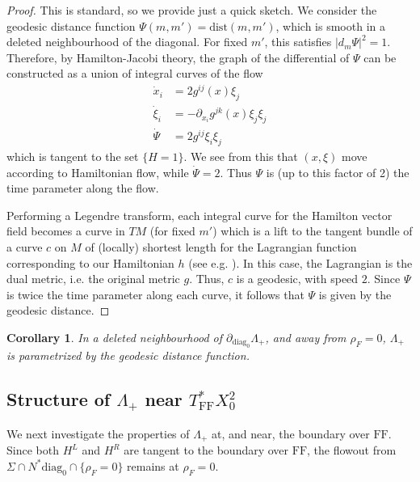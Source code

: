 \documentclass[10pt, a4paper, twoside]{amsart}
\numberwithin{equation}{section}
\newtheorem{corollary}[theorem]{Corollary}
\theoremstyle{remark}
\begin{document}
\begin{proof} This is standard, so we provide just a quick sketch. We consider the geodesic distance function $\Psi(m, m') = {\mathrm{dist}}(m, m')$, which is smooth in a deleted neighbourhood of the diagonal. For fixed $m'$, this satisfies $|d_m \Psi|^2 = 1$. Therefore, by Hamilton-Jacobi theory, the graph of the differential of $\Psi$ can be constructed as a union of integral curves of the flow 
\begin{equation}\begin{aligned}
\dot x_i &= 2 g^{ij}(x) \xi_j \\
\dot \xi_i &= - \partial_{x_i} g^{jk}(x) \xi_j \xi_j \\
\dot \Psi &= 2 g^{ij} \xi_i \xi_j
\end{aligned}\end{equation}
which is tangent to the set $\{ H = 1 \}$. We see from this that $(x, \xi)$ move according to Hamiltonian flow, while $\dot \Psi = 2$. Thus $\Psi$ is (up to this factor of 2) the time parameter along the flow. 

Performing a Legendre transform, each integral curve for the Hamilton vector field becomes a curve in $TM$ (for fixed $m'$) which is a lift to the tangent bundle of a curve $c$ on $M$ of (locally) shortest length for the Lagrangian function corresponding to our Hamiltonian $h$  (see e.g. \cite[Chapter 3]{Arnold}). In this case, the Lagrangian is the dual metric, i.e. the original metric $g$. Thus, $c$ is a geodesic, with speed $2$. Since $\Psi$ is twice the time parameter along each curve, it follows that $\Psi$ is given by the geodesic distance. 
\end{proof}

\begin{corollary} In a deleted neighbourhood of $\partial_{\mathrm{diag}_0} \Lambda_+$, and away from $\rho_F = 0$, $\Lambda_+$ is parametrized by the geodesic distance function. 
\end{corollary}

\subsection{Structure of $\Lambda_+$ near $T^*_{\mathrm{FF}} X^2_0$}

We next investigate the properties of $\Lambda_+$ at, and near, the boundary over ${\mathrm{FF}}$. Since both $H^L$ and $H^R$ are tangent to the boundary over ${\mathrm{FF}}$, the flowout from $\Sigma \cap N^* {\mathrm{diag}_0} \cap \{ \rho_F = 0 \}$ remains at $\rho_F = 0$. 
\end{document}
